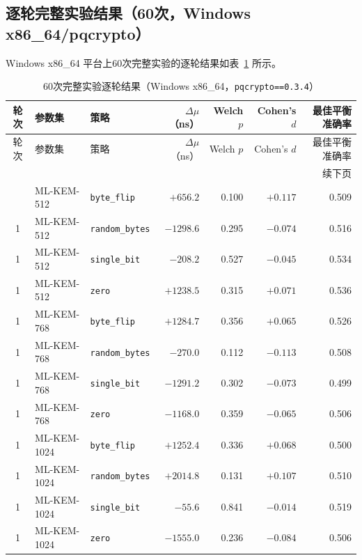 \documentclass[a4paper,fontset=none]{ctexart}
\begin{document}
\subsection*{逐轮完整实验结果（60次，Windows x86\_64/pqcrypto）}

Windows x86\_64 平台上60次完整实验的逐轮结果如表~\ref{tab:all_runs} 所示。

\footnotesize
\begin{longtable}[c]{c>{\raggedright}p{2.2cm}>{\raggedright}p{2.6cm}rrrr}
  \caption{60次完整实验逐轮结果（Windows x86\_64，\texttt{pqcrypto==0.3.4}）}
  \label{tab:all_runs}\\
  \toprule
  轮次 & 参数集 & 策略 & $\Delta\mu$（ns） & Welch $p$ & Cohen's $d$ & 最佳平衡准确率 \\
  \midrule
  \endfirsthead
  \toprule
  轮次 & 参数集 & 策略 & $\Delta\mu$（ns） & Welch $p$ & Cohen's $d$ & 最佳平衡准确率 \\
  \midrule
  \endhead
  \midrule
  \multicolumn{7}{r}{\small 续下页}\\
  \endfoot
  \bottomrule
  \endlastfoot
  1 & ML-KEM-512  & \texttt{byte\_flip}    & $+656.2$   & 0.100 & $+0.117$ & 0.509 \\
  1 & ML-KEM-512  & \texttt{random\_bytes} & $-1298.6$  & 0.295 & $-0.074$ & 0.516 \\
  1 & ML-KEM-512  & \texttt{single\_bit}   & $-208.2$   & 0.527 & $-0.045$ & 0.534 \\
  1 & ML-KEM-512  & \texttt{zero}          & $+1238.5$  & 0.315 & $+0.071$ & 0.536 \\
  1 & ML-KEM-768  & \texttt{byte\_flip}    & $+1284.7$  & 0.356 & $+0.065$ & 0.526 \\
  1 & ML-KEM-768  & \texttt{random\_bytes} & $-270.0$   & 0.112 & $-0.113$ & 0.508 \\
  1 & ML-KEM-768  & \texttt{single\_bit}   & $-1291.2$  & 0.302 & $-0.073$ & 0.499 \\
  1 & ML-KEM-768  & \texttt{zero}          & $-1168.0$  & 0.359 & $-0.065$ & 0.506 \\
  1 & ML-KEM-1024 & \texttt{byte\_flip}    & $+1252.4$  & 0.336 & $+0.068$ & 0.500 \\
  1 & ML-KEM-1024 & \texttt{random\_bytes} & $+2014.8$  & 0.131 & $+0.107$ & 0.510 \\
  1 & ML-KEM-1024 & \texttt{single\_bit}   & $-55.6$    & 0.841 & $-0.014$ & 0.519 \\
  1 & ML-KEM-1024 & \texttt{zero}          & $-1555.0$  & 0.236 & $-0.084$ & 0.506 \\

\end{longtable}
\end{document}
